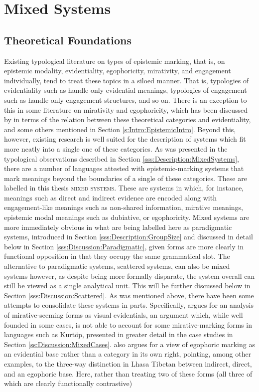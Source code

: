 \section{Mixed Systems}\label{s:Discussion:Mixed}
\subsection{Theoretical Foundations}\label{ss:Discussion:MixedFoundation}
Existing typological literature on types of epistemic marking, that is, on epistemic modality, evidentiality, egophoricity, mirativity, and engagement individually, tend to treat these topics in a siloed manner. That is, typologies of evidentiality such as  handle only evidential meanings, typologies of engagement such as  handle only engagement structures, and so on. There is an exception to this in some literature on mirativity and egophoricity, which has been discussed by  in terms of the relation between these theoretical categories and evidentiality, and some others mentioned in Section \ref{s:Intro:EpistemicIntro}. Beyond this, however, existing research is well suited for the description of systems which fit more neatly into a single one of these categories. As was presented in the typological observations described in Section \ref{sss:Description:MixedSystems}, there are a number of languages attested with epistemic-marking systems that mark meanings beyond the boundaries of a single of these categories. These are labelled in this thesis \textsc{mixed systems}. These are systems in which, for instance, meanings such as direct and indirect evidence are encoded along with engagement-like meanings such as non-shared information, mirative meanings, epistemic modal meanings such as dubiative, or egophoricity. Mixed systems are more immediately obvious in what are being labelled here as paradigmatic systems, introduced in Section \ref{sss:Description:GroupSize} and discussed in detail below in Section \ref{sss:Discussion:Paradigmatic}, given forms are more clearly in functional opposition in that they occupy the same grammatical slot. The alternative to paradigmatic systems, scattered systems, can also be mixed systems however, as despite being more formally disparate, the system overall can still be viewed as a single analytical unit. This will be further discussed below in Section \ref{sss:Discussion:Scattered}. As was mentioned above, there have been some attempts to consolidate these systems in parts. Specifically,  argues for an analysis of mirative-seeming forms as visual evidentials, an argument which, while well founded in some cases, is not able to account for some mirative-marking forms in languages such as Kurtöp, presented in greater detail in the case studies in Section \ref{ss:Discussion:MixedCases}.  also argues for a view of egophoric marking as an evidential base rather than a category in its own right, pointing, among other examples, to the three-way distinction in Lhasa Tibetan between indirect, direct, and an egophoric base. Here, rather than treating two of these forms (all three of which are clearly functionally contrastive) 